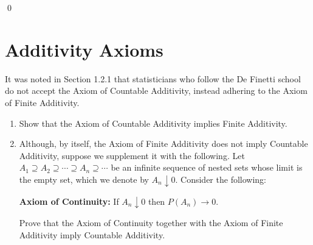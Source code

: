 \qed
\section{Additivity Axioms}

\begin{problembox}
It was noted in Section 1.2.1 that statisticians who follow the De Finetti school do not accept the Axiom of Countable Additivity, instead adhering to the Axiom of Finite Additivity.
\begin{enumerate}[label=(\alph*)]
    \item Show that the Axiom of Countable Additivity implies Finite Additivity.
    \item Although, by itself, the Axiom of Finite Additivity does not imply Countable Additivity, suppose we supplement it with the following. Let $A_1 \supseteq A_2 \supseteq \cdots \supseteq A_n \supseteq \cdots$ be an infinite sequence of nested sets whose limit is the empty set, which we denote by $A_n \downarrow 0$. Consider the following:
    
    \textbf{Axiom of Continuity:} If $A_n \downarrow 0$ then $P(A_n) \to 0$.
    
    Prove that the Axiom of Continuity together with the Axiom of Finite Additivity imply Countable Additivity.
\end{enumerate}
\end{problembox}

